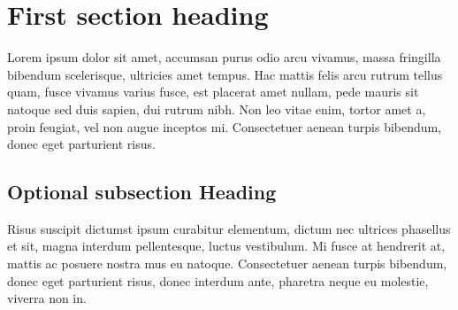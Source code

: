 \section{First section heading}

Lorem ipsum dolor sit amet, accumsan purus odio arcu vivamus, massa fringilla bibendum scelerisque, ultricies amet tempus. Hac mattis felis arcu rutrum tellus quam, fusce vivamus varius fusce, est placerat amet nullam, pede mauris sit natoque sed duis sapien, dui rutrum nibh. Non leo vitae enim, tortor amet a, proin feugiat, vel non augue inceptos mi. Consectetuer aenean turpis bibendum, donec eget parturient risus.
	
\subsection{Optional subsection Heading}

Risus suscipit dictumst ipsum curabitur elementum, dictum nec ultrices phasellus et sit, magna interdum pellentesque, luctus vestibulum. Mi fusce at hendrerit at, mattis ac posuere nostra mus eu natoque. Consectetuer aenean turpis bibendum, donec eget parturient risus, donec interdum ante, pharetra neque eu molestie, viverra non in.